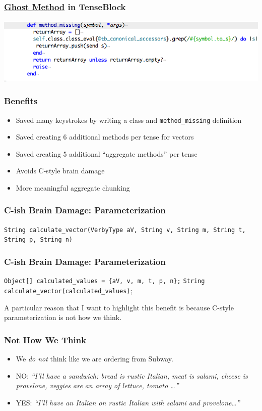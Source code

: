\documentclass[slidestop,compress,mathserif,notes]{beamer}
\begin{document}
\begin{frame}
	\frametitle{\underline{Ghost Method} in TenseBlock}
	\includegraphics[scale=0.45]{img/tenseblock_mm.png}
\end{frame}


\begin{frame}
	\frametitle{Benefits}
	\begin{itemize}
		\item Saved many keystrokes by writing a class and \texttt{method_missing} definition
		\pause
		\item Saved creating 6 additional methods per tense for vectors
		\pause
		\item Saved creating 5 additional ``aggregate methods'' per tense
		\pause
		\item Avoids C-style brain damage
		\pause
		\item More meaningful aggregate chunking
	\end{itemize}
\end{frame}

\begin{frame}
	\frametitle{C-ish Brain Damage:  Parameterization}	
 	\texttt{String calculate\_vector(VerbyType aV, String v, String m, String t, String p, String n)}
\end{frame}

\begin{frame}
	\frametitle{C-ish Brain Damage:  Parameterization}	
	\texttt{Object[] calculated\_values = \{aV, v, m, t, p, n\};} 
	\texttt{String calculate\_vector(calculated\_values)}; 
\end{frame}
\note
{A particular reason that I want to highlight this benefit is because C-style
parameterization is not how we think.
}

\begin{frame}
	\frametitle{Not How We Think}
	\begin{itemize}
		\item We \emph{do not} think like we are ordering from Subway.
		\pause
		\item NO:  \emph{``I'll have a sandwich:  bread is rustic Italian, meat is salami, cheese is provelone, veggies are an array of lettuce, tomato \ldots''}
		\pause
		\item YES:  \emph{``I'll have an Italian on rustic Italian with salami and provelone\ldots''}
	\end{itemize}
	
\end{frame}
\end{document}
